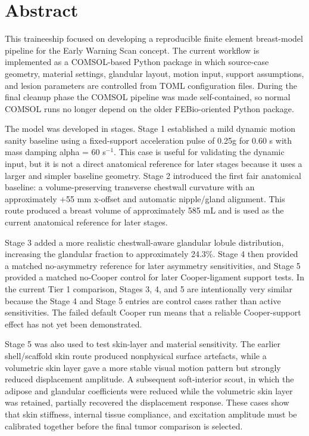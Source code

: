 \section{Abstract}

This traineeship focused on developing a reproducible finite element breast-model pipeline for the Early Warning Scan concept. The current workflow is implemented as a COMSOL-based Python package in which source-case geometry, material settings, glandular layout, motion input, support assumptions, and lesion parameters are controlled from TOML configuration files. During the final cleanup phase the COMSOL pipeline was made self-contained, so normal COMSOL runs no longer depend on the older FEBio-oriented Python package.

The model was developed in stages. Stage 1 established a mild dynamic motion sanity baseline using a fixed-support acceleration pulse of 0.25g for 0.60 s with mass damping alpha = 60 s$^{-1}$. This case is useful for validating the dynamic input, but it is not a direct anatomical reference for later stages because it uses a larger and simpler baseline geometry. Stage 2 introduced the first fair anatomical baseline: a volume-preserving transverse chestwall curvature with an approximately +55 mm x-offset and automatic nipple/gland alignment. This route produced a breast volume of approximately 585 mL and is used as the current anatomical reference for later stages.

Stage 3 added a more realistic chestwall-aware glandular lobule distribution, increasing the glandular fraction to approximately 24.3\%. Stage 4 then provided a matched no-asymmetry reference for later asymmetry sensitivities, and Stage 5 provided a matched no-Cooper control for later Cooper-ligament support tests. In the current Tier 1 comparison, Stages 3, 4, and 5 are intentionally very similar because the Stage 4 and Stage 5 entries are control cases rather than active sensitivities. The failed default Cooper run means that a reliable Cooper-support effect has not yet been demonstrated.

Stage 5 was also used to test skin-layer and material sensitivity. The earlier shell/scaffold skin route produced nonphysical surface artefacts, while a volumetric skin layer gave a more stable visual motion pattern but strongly reduced displacement amplitude. A subsequent soft-interior scout, in which the adipose and glandular coefficients were reduced while the volumetric skin layer was retained, partially recovered the displacement response. These cases show that skin stiffness, internal tissue compliance, and excitation amplitude must be calibrated together before the final tumor comparison is selected.

